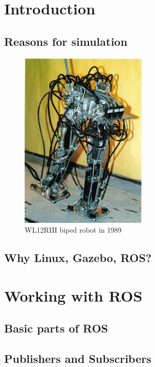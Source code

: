 \documentclass[pdftex,12pt,a4paper]{article}
\begin{document}
  \newpage
  \section{Introduction}
  \subsection{Reasons for simulation}
  
  \begin{figure}[h]
          \centering
          \includegraphics[width=0.55\linewidth]{image/WL-9DR-1980.jpg}
          \caption{WL12RIII biped robot in 1989}
          \label{fig:WL12RIII_robot}
  \end{figure}
  \subsection{Why Linux, Gazebo, ROS?}
  
  \newpage
  \section{Working with ROS}
  \subsection{Basic parts of ROS}
  
  \newpage
  \subsection{Publishers and Subscribers}
  
\end{document}
